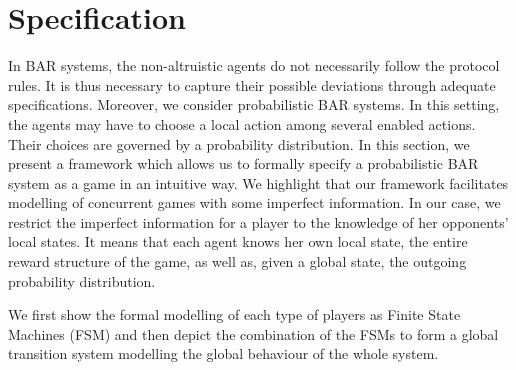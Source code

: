 \section{Specification}\label{sec:spec}

In BAR systems, the non-altruistic agents do not necessarily follow the protocol rules. It is thus necessary to capture their possible deviations through adequate specifications. Moreover, we consider probabilistic BAR systems. In this setting, the agents may have to choose a local action among several enabled actions. Their choices are governed by a probability distribution. In this section, we present a framework which allows us to formally specify a probabilistic BAR system as a game in an intuitive way. We highlight that our framework facilitates modelling of concurrent games with some imperfect information. In our case, we restrict the imperfect information for a player to the knowledge of her opponents' local states. It means that each agent knows her own local state, the entire reward structure of the game, as well as, given a global state, the outgoing probability distribution.

We first show the formal modelling of each type of players as Finite State Machines (FSM) and then depict the combination of the FSMs to form a global transition system modelling the global behaviour of the whole system.

